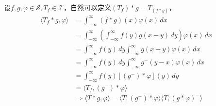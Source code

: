 \documentclass{ctexbook}
\begin{document}
设$f,g,\varphi\in\mathcal{S} ,T_f\in\mathcal{T} $，自然可以定义$(T_f)*g=T_{(f*g)}$，
\begin{align*}
    \langle T_f*g,\varphi\rangle & =\int_{-\infty}^{\infty}(f*g)(x)\varphi(x)\,dx                                                      \\
                                 & =\int_{-\infty}^{\infty}\left(\int_{-\infty}^{\infty}f(y)g(x-y)\,dy\right)\varphi(x)\,dx            \\
                                 & =\int_{-\infty}^{\infty}f(y)\,dy\int_{-\infty}^{\infty}g(x-y)\varphi(x)\,dx                         \\
                                 & =\int_{-\infty}^{\infty}f(y)\,dy\int_{-\infty}^{\infty}g^- (y-x)\varphi(x)\,dx                      \\
                                 & =\int_{-\infty}^{\infty}f(y)[(g^-) *\varphi](y)\,dy                                                 \\
                                 & =\langle T_f,(g^-)*\varphi\rangle                                                                   \\
                                 & \Rightarrow \langle T*g,\varphi\rangle=\langle T,(g^-)*\varphi\rangle\langle T,(g*\varphi)^-\rangle
\end{align*}
\end{document}
